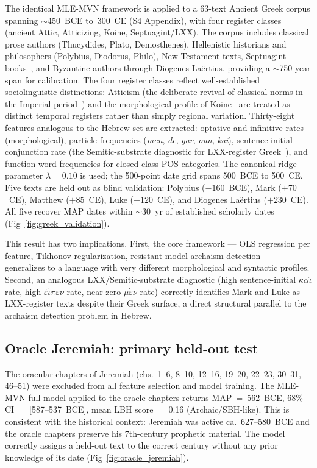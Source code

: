 \documentclass[10pt,letterpaper]{article}
\newcommand{\mvn}{MLE-MVN}
\begin{document}
The identical \mvn{} framework is applied to a 63-text Ancient Greek
corpus spanning $\sim$450~BCE to~300~CE (S4 Appendix), with four
register classes (ancient Attic, Atticizing, Koine, Septuagint/LXX).
The corpus includes classical prose authors (Thucydides, Plato,
Demosthenes), Hellenistic historians and philosophers (Polybius,
Diodorus, Philo), New Testament texts, Septuagint books~\cite{Jobes2015,Marcos2001,Law2013}, and Byzantine
authors through Diogenes La\"{e}rtius, providing a $\sim$750-year span
for calibration.  The four register classes reflect well-established
sociolinguistic distinctions: Atticism (the deliberate revival of classical
norms in the Imperial period~\cite{Swain1996}) and the morphological profile
of Koine~\cite{Mussies1971} are treated as distinct temporal registers
rather than simply regional variation.
Thirty-eight features analogous to the Hebrew set are
extracted: optative and infinitive rates (morphological), particle
frequencies (\textit{men}, \textit{de}, \textit{gar},
\textit{oun}, \textit{kai}),
sentence-initial conjunction rate (the Semitic-substrate diagnostic for
LXX-register Greek~\cite{Evans2001}),
and function-word frequencies for closed-class POS categories.  The
canonical ridge parameter $\lambda = 0.10$ is used; the 500-point date
grid spans 500~BCE to 500~CE.  Five texts are held out as blind
validation: Polybius ($-160$~BCE), Mark ($+70$~CE), Matthew ($+85$~CE),
Luke ($+120$~CE), and Diogenes La\"{e}rtius ($+230$~CE).  All five
recover MAP dates within $\sim$30~yr of established scholarly dates
(Fig~\ref{fig:greek_validation}).

This result has two implications.  First, the core framework --- OLS
regression per feature, Tikhonov regularization, resistant-model archaism
detection --- generalizes to a language with very different morphological
and syntactic profiles.  Second, an analogous LXX/Semitic-substrate
diagnostic (high sentence-initial $\kappa\alpha\acute{\iota}$ rate,
high $\varepsilon\tilde{\iota}\pi\varepsilon\nu$ rate, near-zero $\mu\acute{\varepsilon}\nu$
rate) correctly identifies Mark and Luke as LXX-register texts despite their
Greek surface, a direct structural parallel to the archaism detection
problem in Hebrew.

\subsection*{Oracle Jeremiah: primary held-out test}

The oracular chapters of Jeremiah (chs.~1--6, 8--10, 12--16, 19--20,
22--23, 30--31, 46--51) were excluded from all feature selection and
model training.  The \mvn{} full model applied to the oracle chapters
returns MAP~=~562~BCE, 68\% CI~=~[587--537~BCE], mean LBH
score~=~0.16 (Archaic/SBH-like).  This is consistent with the historical
context: Jeremiah was active ca.\ 627--580~BCE and the oracle chapters
preserve his 7th-century prophetic material.  The model correctly assigns
a held-out text to the correct century without any prior knowledge of its
date (Fig~\ref{fig:oracle_jeremiah}).
\end{document}
